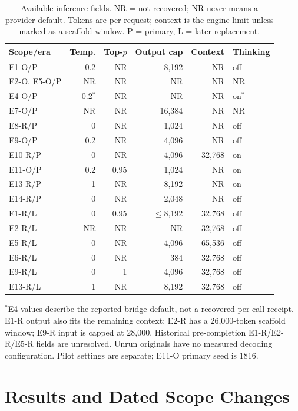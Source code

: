 \documentclass[a4paper,runningheads]{llncs}
\begin{document}
\begin{table}[t]
\caption{Available inference fields. NR = not recovered; NR never means a
provider default. Tokens are per request; context is the engine limit unless
marked as a scaffold window. P = primary, L = later replacement.}
\label{tab:inference}\centering\small\setlength{\tabcolsep}{3pt}
\begin{tabularx}{\textwidth}{@{}l r r r r Y@{}}\toprule
Scope/era & Temp. & Top-$p$ & Output cap & Context & Thinking \\\midrule
E1-O/P & 0.2 & NR & 8,192 & NR & off \\
E2-O, E5-O/P & NR & NR & NR & NR & NR \\
E4-O/P & 0.2$^*$ & NR & NR & NR & on$^*$ \\
E7-O/P & NR & NR & 16,384 & NR & NR \\
E8-R/P & 0 & NR & 1,024 & NR & off \\
E9-O/P & 0.2 & NR & 4,096 & NR & off \\
E10-R/P & 0 & NR & 4,096 & 32,768 & on \\
E11-O/P & 0.2 & 0.95 & 1,024 & NR & on \\
E13-R/P & 1 & NR & 8,192 & NR & on \\
E14-R/P & 0 & NR & 2,048 & NR & off \\\midrule
E1-R/L & 0 & 0.95 & $\leq$8,192 & 32,768 & off \\
E2-R/L & NR & NR & NR & 32,768 & off \\
E5-R/L & 0 & NR & 4,096 & 65,536 & off \\
E6-R/L & 0 & NR & 384 & 32,768 & off \\
E9-R/L & 0 & 1 & 4,096 & 32,768 & off \\
E13-R/L & 1 & NR & 8,192 & 32,768 & off \\\bottomrule
\end{tabularx}
\par\smallskip\footnotesize\raggedright
$^*$E4 values describe the reported bridge default, not a recovered per-call
receipt. E1-R output also fits the remaining context; E2-R has a 26,000-token
scaffold window; E9-R input is capped at 28,000. Historical pre-completion
E1-R/E2-R/E5-R fields are unresolved. Unrun originals have no measured decoding
configuration. Pilot settings are separate; E11-O primary seed is 1816.
\end{table}

\section{Results and Dated Scope Changes}
\label{sec:results}
\end{document}
